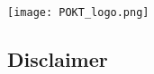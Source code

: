 \documentclass[
	a4paper, %
	12pt, %
]{CSSullivanBusinessReport}
\begin{document}

\thispagestyle{empty} %

	\vspace*{-0.075\textheight} %
	
	\hfill\texttt{[image: POKT\_logo.png]} %

	\vspace{0.15\textheight} %

	\parbox{0.9\textwidth}{\fontsize{50pt}{52pt}\selectfont\raggedright\textbf{\reporttitle}\par} %
	
	\vspace{0.03\textheight} %
	
	{\LARGE\textit{\textbf{\reportsubtitle}}\par} %
	
	\vfill %
	
	{\Large\reportauthors\par} %
	
	\vfill\vfill\vfill %
	
	{\large\reportdate\par} %

\newpage


\thispagestyle{empty} %

	\footnotesize %
	
	\subsection*{Disclaimer}
	
\end{document}
